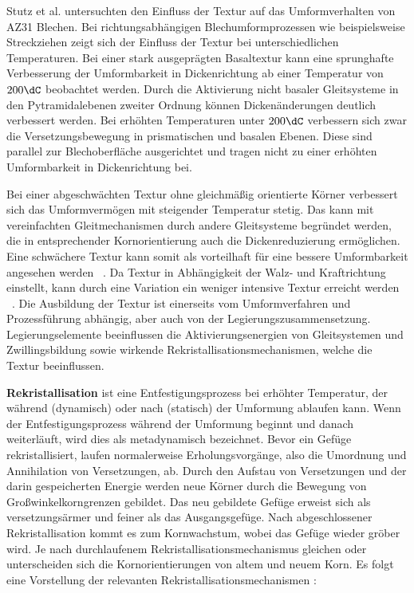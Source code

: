 Stutz et al. \cite{Stutz.2015} untersuchten den Einfluss der Textur auf das Umformverhalten von AZ31 Blechen.
Bei richtungsabhängigen Blechumformprozessen wie beispielsweise Streckziehen zeigt sich der Einfluss der Textur bei unterschiedlichen Temperaturen.
Bei einer stark ausgeprägten Basaltextur kann eine sprunghafte Verbesserung der Umformbarkeit in Dickenrichtung ab einer Temperatur von $200\dC$ beobachtet werden.
Durch die Aktivierung nicht basaler Gleitsysteme in den Pytramidalebenen zweiter Ordnung können Dickenänderungen deutlich verbessert werden.
Bei erhöhten Temperaturen unter $200\dC$ verbessern sich zwar die Versetzungsbewegung in prismatischen und basalen Ebenen.
Diese sind parallel zur Blechoberfläche ausgerichtet und tragen nicht zu einer erhöhten Umformbarkeit in Dickenrichtung bei.

Bei einer abgeschwächten Textur ohne gleichmäßig orientierte Körner verbessert sich das Umformvermögen mit steigender Temperatur stetig.
Das kann mit vereinfachten Gleitmechanismen durch andere Gleitsysteme begründet werden, die in entsprechender Kornorientierung auch die Dickenreduzierung ermöglichen. \cite{Stutz.2015}
Eine schwächere Textur kann somit als vorteilhaft für eine bessere Umformbarkeit angesehen werden \cite{Bettles.2005,Yukutake.2003}~.
Da Textur in Abhängigkeit der Walz- und Kraftrichtung einstellt, kann durch eine Variation ein weniger intensive Textur erreicht werden \cite{Chino.2007}~.
Die Ausbildung der Textur ist einerseits vom Umformverfahren und Prozessführung abhängig, aber auch von der Legierungszusammensetzung.
Legierungselemente beeinflussen die Aktivierungsenergien von Gleitsystemen und Zwillingsbildung sowie wirkende Rekristallisationsmechanismen, welche die Textur beeinflussen.


\textbf{Rekristallisation} ist eine Entfestigungsprozess bei erhöhter Temperatur, der während (dynamisch) oder nach (statisch) der Umformung ablaufen kann.
Wenn der Entfestigungsprozess während der Umformung beginnt und danach weiterläuft, wird dies als metadynamisch bezeichnet.
Bevor ein Gefüge rekristallisiert, laufen normalerweise Erholungsvorgänge, also die Umordnung und Annihilation von Versetzungen, ab.
Durch den Aufstau von Versetzungen und der darin gespeicherten Energie werden neue Körner durch die Bewegung von Großwinkelkorngrenzen gebildet.
Das neu gebildete Gefüge erweist sich als versetzungsärmer und feiner als das Ausgangsgefüge.
Nach abgeschlossener Rekristallisation kommt es zum Kornwachstum, wobei das Gefüge wieder gröber wird.
Je nach durchlaufenem Rekristallisationsmechanismus gleichen oder unterscheiden sich die Kornorientierungen von altem und neuem Korn. \cite{Ullmann.2014}
Es folgt eine Vorstellung der relevanten Rekristallisationsmechanismen \cite{Kittner.2019}:

